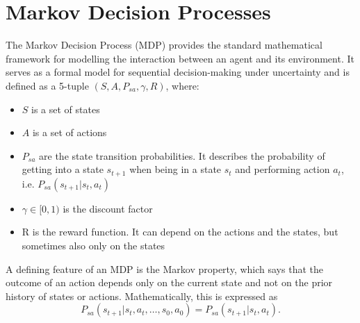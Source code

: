 \section{Markov Decision Processes}\label{MDP}
The Markov Decision Process (MDP) provides the standard mathematical framework for modelling the interaction 
between an agent and its environment. It serves as a formal model for sequential decision-making under 
uncertainty and is defined as a 5-tuple $(S, A, P_{sa}, \gamma, R)$, where:

\begin{itemize}
    \item $S$ is a set of states
    \item $A$ is a set of actions
    \item $P_{sa}$ are the state transition probabilities. It describes the probability of getting into a state $s_{t+1}$ when being in a state $s_t$ and performing action $a_t$, i.e. $P_{sa}(s_{t+1}|s_t,a_t)$
    \item $\gamma \in [0,1)$ is the discount factor 
    \item R is the reward function. It can depend on the actions and the states, but sometimes also only on the states
\end{itemize}
A defining feature of an MDP is the Markov property, which says that the outcome of an action depends only on 
the current state and not on the prior history of states or actions. Mathematically, this is expressed as
\begin{equation*}
    P_{sa}(s_{t+1}|s_t,a_t,\dots,s_0,a_0) = P_{sa}(s_{t+1}|s_t,a_t).
\end{equation*}



